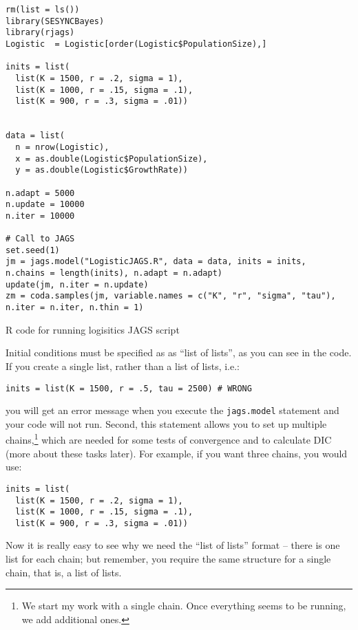 \documentclass[12pt,english]{article}
\begin{document}
\begin{algorithm}
\begin{Verbatim}[frame=single]
rm(list = ls())
library(SESYNCBayes)
library(rjags)
Logistic  = Logistic[order(Logistic$PopulationSize),]

inits = list(
  list(K = 1500, r = .2, sigma = 1),
  list(K = 1000, r = .15, sigma = .1),
  list(K = 900, r = .3, sigma = .01))


data = list(
  n = nrow(Logistic),
  x = as.double(Logistic$PopulationSize),
  y = as.double(Logistic$GrowthRate))

n.adapt = 5000
n.update = 10000
n.iter = 10000

# Call to JAGS
set.seed(1)
jm = jags.model("LogisticJAGS.R", data = data, inits = inits, 
n.chains = length(inits), n.adapt = n.adapt)
update(jm, n.iter = n.update)
zm = coda.samples(jm, variable.names = c("K", "r", "sigma", "tau"),
n.iter = n.iter, n.thin = 1)
\end{Verbatim}
\caption{R code for running logisitics JAGS script}
\label{alg:R-code-for}
\end{algorithm}

Initial conditions must be specified as as \enquote{list of lists}, as you can see in the code. If you create a single list, rather than a list of lists, i.e.:

\begin{Verbatim}
inits = list(K = 1500, r = .5, tau = 2500) # WRONG
\end{Verbatim}

\noindent you will get an error message when you execute the \texttt{jags.model} statement and your code will not run. Second, this statement allows you to set up multiple chains,\footnote{We start my work with a single chain. Once everything seems to be running, we add additional ones.} which are needed for some tests of convergence and to calculate DIC (more about these tasks later). For example, if you want three chains, you would use:

\begin{Verbatim}
inits = list(
  list(K = 1500, r = .2, sigma = 1),
  list(K = 1000, r = .15, sigma = .1),
  list(K = 900, r = .3, sigma = .01))
\end{Verbatim}

\noindent Now it is really easy to see why we need the \enquote{list of lists} format -- there is one list for each chain; but remember, you require the same structure for a single chain, that is, a list of lists.
\end{document}
